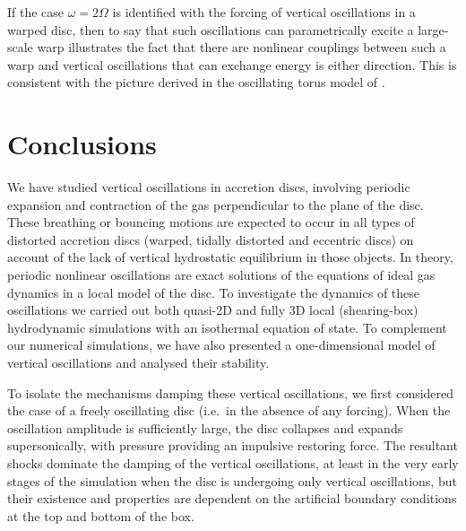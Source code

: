 \documentclass[fleqn,usenatbib]{mnras}
\begin{document}
If the case $\omega=2\Omega$ is identified with the forcing of vertical oscillations in a warped disc, then to say that such oscillations can parametrically excite a large-scale warp illustrates the fact that there are nonlinear couplings between such a warp and vertical oscillations that can exchange energy is either direction. This is consistent with the picture derived in the oscillating torus model of \citet{fairbairn2021non}.

\section{Conclusions}
\label{CONCLUSIONS}
We have studied vertical oscillations in accretion discs, involving periodic expansion and contraction of the gas perpendicular to the plane of the disc. These breathing or bouncing motions are expected to occur in all types of distorted accretion discs (warped, tidally distorted and eccentric discs) on account of the lack of vertical hydrostatic equilibrium in those objects. 
In theory, periodic nonlinear oscillations are exact solutions of the equations of ideal gas dynamics in a local model of the disc. To investigate the dynamics of these oscillations we carried out both quasi-2D and fully 3D local (shearing-box) hydrodynamic simulations with an isothermal equation of state. To complement our numerical simulations, we have also presented a one-dimensional model of vertical oscillations and analysed their stability.

To isolate the mechanisms damping these vertical oscillations, we first considered the case of a freely oscillating disc (i.e.\ in the absence of any forcing). When the oscillation amplitude is sufficiently large, the disc collapses and expands supersonically, with pressure providing an impulsive restoring force. The resultant shocks dominate the damping of the vertical oscillations, at least in the very early stages of the simulation when the disc is undergoing only vertical oscillations, but their existence and properties are dependent on the artificial boundary conditions at the top and bottom of the box.
\end{document}
